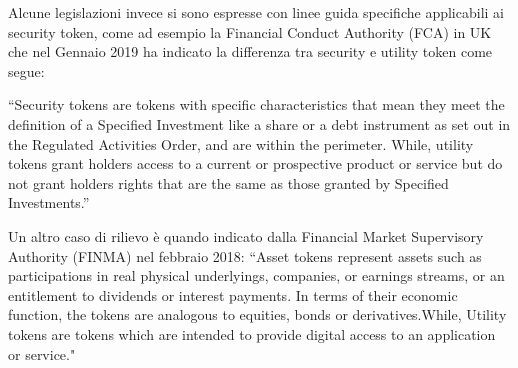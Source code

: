 Alcune legislazioni invece si sono espresse con linee guida specifiche applicabili ai security token, come ad esempio la Financial Conduct Authority (FCA) in UK che nel Gennaio 2019 ha indicato la differenza tra security e utility token come segue:

“Security tokens are tokens with specific characteristics that mean they meet the definition of a Specified Investment like a share or a debt instrument as set out in the Regulated Activities Order, and are within the perimeter.
While, utility tokens grant holders access to a current or prospective product or service but do not grant holders rights that are the same as those granted by Specified Investments.”

Un altro caso di rilievo è quando indicato dalla Financial Market
Supervisory Authority (FINMA) nel febbraio 2018:
“Asset tokens represent assets such as participations in real physical underlyings, companies, or earnings streams, or an entitlement to dividends or interest payments. In terms of their economic function, the tokens are analogous to equities, bonds or derivatives.While, Utility tokens are tokens which are intended to provide digital access
to an application or service." 

